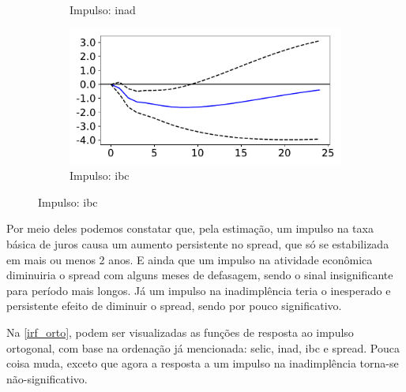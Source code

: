 \documentclass[a4paper,
               article,
               12pt,
               openany,
               oneside,
               english,
               brazil]{abntex2}
\numberwithin{equation}{section}
\begin{document}
\begin{figure}[!hbt]
\begin{subfigure}[t]{.5\linewidth}
            \caption{Impulso: inad}
        \end{subfigure}
        \begin{subfigure}[t]{.5\linewidth}
            \includegraphics[width = \textwidth, scale=1]{irf/spread_ibc.pdf}
            \caption{Impulso: ibc}
        \end{subfigure}
    \end{figure}
    
    Por meio deles podemos constatar que, pela estimação, um impulso na taxa básica de juros causa um aumento persistente no spread, que só se estabilizada em mais ou menos 2 anos. E ainda que um impulso na atividade econômica diminuiria o spread com alguns meses de defasagem, sendo o sinal insignificante para período mais longos. Já um impulso na inadimplência teria o inesperado e persistente efeito de diminuir o spread, sendo por pouco significativo. 

    Na \autoref{irf_orto}, podem ser visualizadas as funções de resposta ao impulso ortogonal, com base na ordenação já mencionada: selic, inad, ibc e spread. Pouca coisa muda, exceto que agora a resposta a um impulso na inadimplência torna-se não-significativo.
\end{document}
